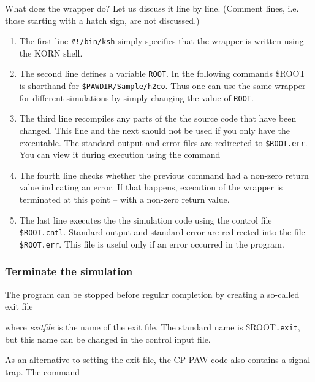 \documentclass[final,12pt]{article}
\begin{document}
What does the wrapper do? Let us discuss it line by line. (Comment
lines, i.e. those starting with a hatch sign, are not discussed.)
\begin{enumerate}
\item The first line {\tt \#!/bin/ksh} simply specifies that the
  wrapper is written using the KORN shell.  
\item The second line defines a variable {\tt ROOT}. In the following
  commands \${ROOT} is shorthand for {\tt \$PAWDIR/Sample/h2co}. Thus
  one can use the same wrapper for different simulations by simply
  changing the value of {\tt ROOT}.
\item The third line recompiles any parts of the the source code that
  have been changed.  This line and the next should not be used if
  you only have the executable. The standard output and error files
  are redirected to {\tt \${ROOT}.err}. You can view it during
  execution using the command\hfill\break\medskip{}\medskip
\item The fourth line checks whether the previous command had a
  non-zero return value indicating an error. If that happens,
  execution of the wrapper is terminated at this point -- with a
  non-zero return value.
\item 
\begin{sloppypar}
  The last line executes the the simulation code using the control
  file {\tt \${ROOT}.cntl}. Standard output and standard error are
  redirected into the file {\tt \${ROOT}.err}. This file is useful
  only if an error occurred in the program.
\end{sloppypar}
\end{enumerate}

\subsubsection{Terminate the simulation}

The program can be stopped before regular completion by creating a
so-called exit file

\bigskip{}\bigskip

\noindent where {\it exitfile} is the name of the exit file. 
The standard name is \$ROOT{\tt .exit}, but this name can be changed
in the control input file.

As an alternative to setting the exit file, the CP-PAW code also contains
a signal trap. The command

\bigskip{}\bigskip
\end{document}
